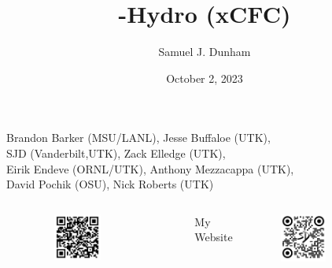 \documentclass{beamer}
\title[SXS NR Community Call]{\thornado-Hydro (xCFC)}
\author{Samuel J. Dunham}
\date{October 2, 2023}
\begin{document}
\begin{frame}

  \titlepage

  \vspace{-1em}

  \begin{center}
    Brandon Barker (MSU/LANL), %
    Jesse Buffaloe (UTK), \\
    SJD (Vanderbilt,UTK), %
    Zack Elledge (UTK), \\
    Eirik Endeve (ORNL/UTK), %
    Anthony Mezzacappa (UTK), \\
    David Pochik (OSU), %
    Nick Roberts (UTK)
  \end{center}

  \vspace{-1em}

  \begin{columns}[c]

      \begin{center}\thornado\end{center}
      \vspace{-1.5em}
      \begin{figure}[htb!]
        \centering
        \includegraphics[width=0.5\textwidth]{fig.thornado.png}
      \end{figure}

      \begin{center}My Website\end{center}
      \vspace{-1.5em}
      \begin{figure}[htb!]
        \centering
        \includegraphics[width=0.5\textwidth]{fig.website.png}
      \end{figure}

  \end{columns}

\end{frame}
\end{document}
